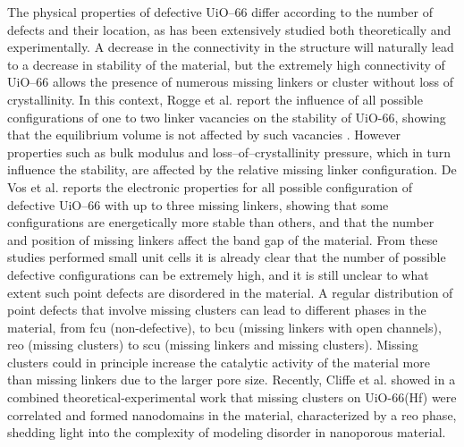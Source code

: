 The physical properties of defective UiO--66 differ according to the number of defects and their location, as has been extensively studied both theoretically and experimentally. A decrease in the connectivity in the structure will naturally lead to a decrease in stability of the material, but the extremely high connectivity of UiO--66 allows the presence of numerous missing linkers or cluster without loss of crystallinity. In this context, Rogge et al. report the influence of all possible configurations of one to two linker vacancies on the stability of UiO-66, showing that the equilibrium volume is not affected by such vacancies \cite{rogge2016thermodynamic}. However properties such as bulk modulus and loss--of--crystallinity pressure, which in turn influence the stability, are affected by the relative missing linker configuration. De Vos et al.\cite{devos2017missing} reports the electronic properties for all possible configuration of defective UiO--66 with up to three missing linkers, showing that some configurations are energetically more stable than others, and that the number and position of missing linkers affect the band gap of the material. From these studies performed small unit cells it is already clear that the number of possible defective configurations can be extremely high, and it is still unclear to what extent such point defects are disordered in the material. A regular distribution of point defects that involve missing clusters can lead to different phases in the material, from fcu (non-defective), to bcu (missing linkers with open channels), reo (missing clusters) to scu (missing linkers and missing clusters). Missing clusters could in principle increase the catalytic activity of the material more than missing linkers due to the larger pore size. Recently, Cliffe et al. \cite{cliffe2014correlated} showed in a combined theoretical-experimental work that missing clusters on UiO-66(Hf) were correlated and formed nanodomains in the material, characterized by a reo phase, shedding light into the complexity of modeling disorder in nanoporous material. 


